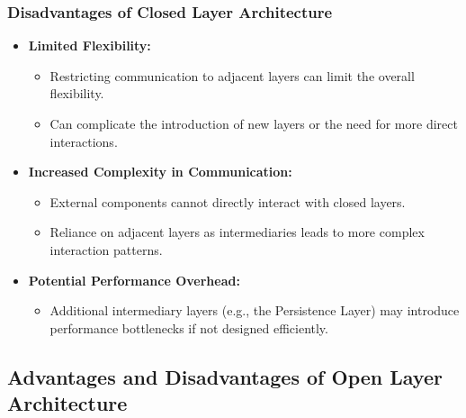 \documentclass[aspectratio=169, table]{beamer}
\begin{document}
\begin{frame}
	\frametitle{Disadvantages of Closed Layer Architecture}
	\begin{itemize}
		\item \textbf{Limited Flexibility:}
		\begin{itemize}
			\item Restricting communication to adjacent layers can limit the overall flexibility.
			\item Can complicate the introduction of new layers or the need for more direct interactions.
		\end{itemize}
		\item \textbf{Increased Complexity in Communication:}
		\begin{itemize}
			\item External components cannot directly interact with closed layers.
			\item Reliance on adjacent layers as intermediaries leads to more complex interaction patterns.
		\end{itemize}
		\item \textbf{Potential Performance Overhead:}
		\begin{itemize}
			\item Additional intermediary layers (e.g., the Persistence Layer) may introduce performance bottlenecks if not designed efficiently.
		\end{itemize}
	\end{itemize}
\end{frame}

\subsection{Advantages and Disadvantages of Open Layer Architecture}
\end{document}
